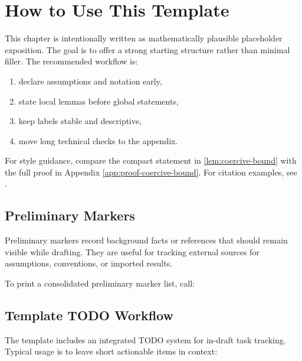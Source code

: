 \section{How to Use This Template}
\label{sec:template-workflow}

This chapter is intentionally written as mathematically plausible placeholder exposition. The goal is to offer a strong starting structure rather than minimal filler. The recommended workflow is:
\begin{enumerate}
    \item declare assumptions and notation early,
    \item state local lemmas before global statements,
    \item keep labels stable and descriptive,
    \item move long technical checks to the appendix.
\end{enumerate}

For style guidance, compare the compact statement in \cref{lem:coercive-bound} with the full proof in Appendix \ref{app:proof-coercive-bound}. For citation examples, see \cite{rudin1976principles,evans2010pde}.

\subsection{Preliminary Markers}
\label{ssec:preliminary-markers}

Preliminary markers record background facts or references that should remain visible while drafting.
They are useful for tracking external sources for assumptions, conventions, or imported results.

To print a consolidated preliminary marker list, call:
\listofprelims

\subsection{Template TODO Workflow}
\label{ssec:template-todos}

The template includes an integrated TODO system for in-draft task tracking.
Typical usage is to leave short actionable items in context:


